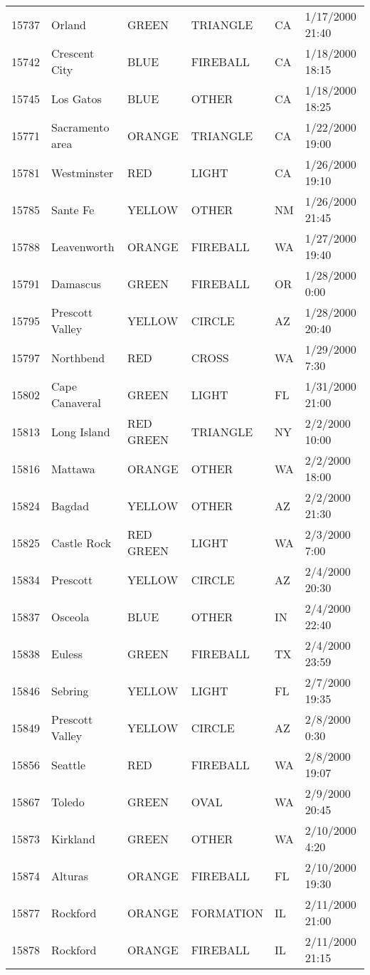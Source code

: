 \begin{tabular}{llllll}
15737 & Orland & GREEN & TRIANGLE & CA & 1/17/2000 21:40 \\
15742 & Crescent City & BLUE & FIREBALL & CA & 1/18/2000 18:15 \\
15745 & Los Gatos & BLUE & OTHER & CA & 1/18/2000 18:25 \\
15771 & Sacramento area & ORANGE & TRIANGLE & CA & 1/22/2000 19:00 \\
15781 & Westminster & RED & LIGHT & CA & 1/26/2000 19:10 \\
15785 & Sante Fe & YELLOW & OTHER & NM & 1/26/2000 21:45 \\
15788 & Leavenworth & ORANGE & FIREBALL & WA & 1/27/2000 19:40 \\
15791 & Damascus & GREEN & FIREBALL & OR & 1/28/2000 0:00 \\
15795 & Prescott Valley & YELLOW & CIRCLE & AZ & 1/28/2000 20:40 \\
15797 & Northbend & RED & CROSS & WA & 1/29/2000 7:30 \\
15802 & Cape Canaveral & GREEN & LIGHT & FL & 1/31/2000 21:00 \\
15813 & Long Island & RED GREEN & TRIANGLE & NY & 2/2/2000 10:00 \\
15816 & Mattawa & ORANGE & OTHER & WA & 2/2/2000 18:00 \\
15824 & Bagdad & YELLOW & OTHER & AZ & 2/2/2000 21:30 \\
15825 & Castle Rock & RED GREEN & LIGHT & WA & 2/3/2000 7:00 \\
15834 & Prescott & YELLOW & CIRCLE & AZ & 2/4/2000 20:30 \\
15837 & Osceola & BLUE & OTHER & IN & 2/4/2000 22:40 \\
15838 & Euless & GREEN & FIREBALL & TX & 2/4/2000 23:59 \\
15846 & Sebring & YELLOW & LIGHT & FL & 2/7/2000 19:35 \\
15849 & Prescott Valley & YELLOW & CIRCLE & AZ & 2/8/2000 0:30 \\
15856 & Seattle & RED & FIREBALL & WA & 2/8/2000 19:07 \\
15867 & Toledo & GREEN & OVAL & WA & 2/9/2000 20:45 \\
15873 & Kirkland & GREEN & OTHER & WA & 2/10/2000 4:20 \\
15874 & Alturas & ORANGE & FIREBALL & FL & 2/10/2000 19:30 \\
15877 & Rockford & ORANGE & FORMATION & IL & 2/11/2000 21:00 \\
15878 & Rockford & ORANGE & FIREBALL & IL & 2/11/2000 21:15 \\

\end{tabular}
